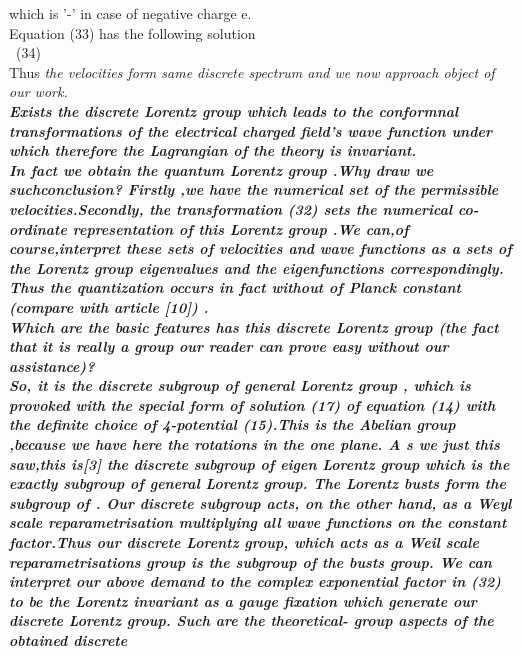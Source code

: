 \documentclass[a4paper,12pt] {article}
\begin{document}
{ \coordHE{} \rm  which is '-' in  case of negative charge e.\\ Equation  (33) has the following
solution \\\coordHE{} \ (34) \\Thus \it the
velocities form same discrete spectrum \rm and we now approach object of our work.\\ \bf Exists the
 discrete Lorentz group which leads to the conformnal transformations of the electrical charged field's
 wave function under which therefore the Lagrangian of the theory is invariant.
\\\rm  In fact we obtain \it the quantum Lorentz group .\rm Why draw we suchconclusion? Firstly ,we
 have the numerical set of the permissible velocities.Secondly, the transformation (32) sets
 \it the numerical co-ordinate representation of this Lorentz group  .\rm We can,of course,interpret these
sets of velocities and wave functions  \it as a sets of the Lorentz group  eigenvalues  and the
eigenfunctions  correspondingly. \rm Thus the quantization occurs \it in fact without of Planck
constant  \myHighlight{$\hbar$}\coordHE{}\rm  (compare with article  [10]) .
\\Which are the basic features has this discrete Lorentz group (the fact that it is really a group our reader
 can   prove  easy without our assistance)?\\So, it is \it the discrete subgroup of general Lorentz group ,\rm
which is provoked with the special form of solution (17) of equation (14) with the definite choice of
4-potential (15).This is the \it  Abelian \rm group ,because we have here the rotations in  the one plane. A
s we just this saw,this is[3] \it the discrete subgroup of eigen Lorentz group \coordHE{}\rm which is the \it exactly
\rm subgroup of general Lorentz group.
The  Lorentz busts form  the subgroup of   \coordHE{}. Our discrete subgroup acts, on the other
 hand, as a \it  Weyl scale reparametrisation \rm multiplying
all wave functions on the constant factor.Thus \it our discrete Lorentz group, which acts as a Weil scale
 reparametrisations group is the subgroup of the busts group. \rm We can interpret our above demand to
 the complex exponential factor in (32)  to be the  Lorentz invariant as a \it gauge fixation which generate
 our discrete  Lorentz group.  \rm Such are the theoretical- group aspects of the obtained discrete
}
\end{document}
